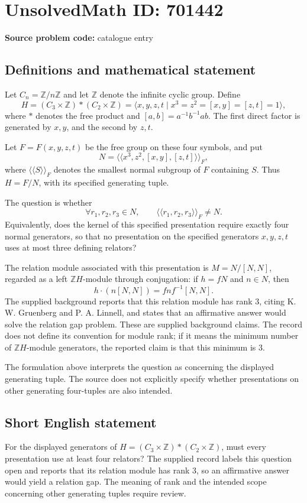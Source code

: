 \documentclass[11pt]{article}
\newcommand{\Z}{\mathbb{Z}}
\begin{document}
\section*{UnsolvedMath ID: 701442}
\textbf{Source problem code:} catalogue entry
\subsection{Definitions and mathematical statement}
Let \(C_n=\Z/n\Z\) and let \(\Z\) denote the infinite cyclic group. Define
\[
H=(C_3\times\Z)*(C_2\times\Z)
 =\langle x,y,z,t\mid x^3=z^2=[x,y]=[z,t]=1\rangle,
\]
where \(*\) denotes the free product and \([a,b]=a^{-1}b^{-1}ab\). The first direct factor is generated by \(x,y\), and the second by \(z,t\).

Let \(F=F(x,y,z,t)\) be the free group on these four symbols, and put
\[
N=\langle\!\langle x^3,z^2,[x,y],[z,t]\rangle\!\rangle_F,
\]
where \(\langle\!\langle S\rangle\!\rangle_F\) denotes the smallest normal subgroup of \(F\) containing \(S\). Thus \(H=F/N\), with its specified generating tuple.

The question is whether
\[
\forall r_1,r_2,r_3\in N,\qquad
\langle\!\langle r_1,r_2,r_3\rangle\!\rangle_F\ne N.
\]
Equivalently, does the kernel of this specified presentation require exactly four normal generators, so that no presentation on the specified generators \(x,y,z,t\) uses at most three defining relators?

The relation module associated with this presentation is \(M=N/[N,N]\), regarded as a left \(\Z H\)-module through conjugation: if \(h=fN\) and \(n\in N\), then
\[
h\cdot(n[N,N])=fnf^{-1}[N,N].
\]
The supplied background reports that this relation module has rank \(3\), citing K. W. Gruenberg and P. A. Linnell, and states that an affirmative answer would solve the relation gap problem. These are supplied background claims. The record does not define its convention for module rank; if it means the minimum number of \(\Z H\)-module generators, the reported claim is that this minimum is \(3\).

The formulation above interprets the question as concerning the displayed generating tuple. The source does not explicitly specify whether presentations on other generating four-tuples are also intended.
\subsection{Short English statement}
For the displayed generators of \(H=(C_3\times\Z)*(C_2\times\Z)\), must every presentation use at least four relators? The supplied record labels this question open and reports that its relation module has rank \(3\), so an affirmative answer would yield a relation gap. The meaning of rank and the intended scope concerning other generating tuples require review.
\end{document}
